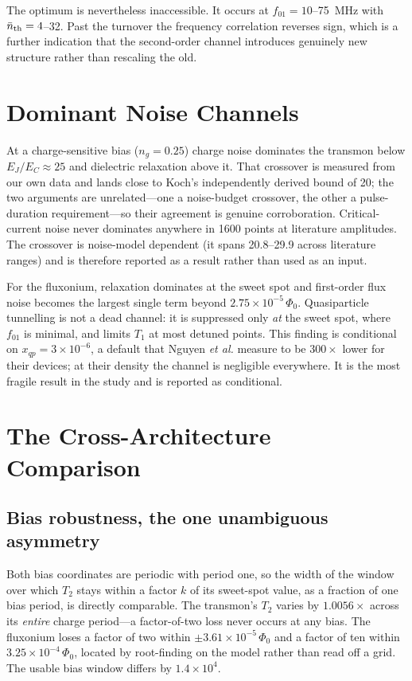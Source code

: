 \documentclass[journal]{IEEEtran}
\begin{document}
The optimum is nevertheless inaccessible. It occurs at $f_{01} = 10$--\SI{75}{\mega\hertz}
with $\bar n_{\rm th} = 4$--32. Past the turnover the frequency correlation reverses sign,
which is a further indication that the second-order channel introduces genuinely new
structure rather than rescaling the old.

\section{Dominant Noise Channels}

At a charge-sensitive bias ($n_g = 0.25$) charge noise dominates the transmon below
$E_J/E_C \approx 25$ and dielectric relaxation above it. That crossover is measured from our
own data and lands close to Koch's independently derived bound of 20; the two arguments are
unrelated---one a noise-budget crossover, the other a pulse-duration requirement---so their
agreement is genuine corroboration. Critical-current noise never dominates anywhere in 1600
points at literature amplitudes. The crossover is noise-model dependent (it spans 20.8--29.9
across literature ranges) and is therefore reported as a result rather than used as an input.

For the fluxonium, relaxation dominates at the sweet spot and first-order flux noise becomes
the largest single term beyond $2.75\times10^{-5}\,\Phi_0$. Quasiparticle tunnelling is not a
dead channel: it is suppressed only \emph{at} the sweet spot, where $f_{01}$ is minimal, and
limits $T_1$ at most detuned points. This finding is conditional on
$x_{qp} = 3\times10^{-6}$, a default that Nguyen \emph{et al.} measure to be $300\times$
lower for their devices; at their density the channel is negligible everywhere. It is the
most fragile result in the study and is reported as conditional.

\section{The Cross-Architecture Comparison}

\subsection{Bias robustness, the one unambiguous asymmetry}

Both bias coordinates are periodic with period one, so the width of the window over which
$T_2$ stays within a factor $k$ of its sweet-spot value, as a fraction of one bias period, is
directly comparable. The transmon's $T_2$ varies by $1.0056\times$ across its \emph{entire}
charge period---a factor-of-two loss never occurs at any bias. The fluxonium loses a factor
of two within $\pm 3.61\times10^{-5}\,\Phi_0$ and a factor of ten within
$3.25\times10^{-4}\,\Phi_0$, located by root-finding on the model rather than read off a
grid. The usable bias window differs by $1.4\times10^{4}$.
\end{document}
